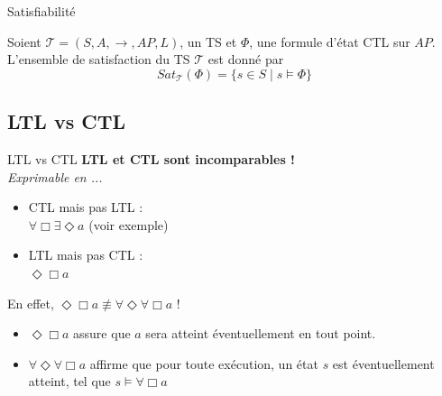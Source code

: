 \documentclass[compress]{beamer}
\begin{document}
\begin{frame}{Satisfiabilité}
  \begin{definition}
    Soient $\mathcal{T} = (S, A, \rightarrow, AP, L)$, un TS et
    $\Phi$, une formule d'état CTL sur $AP$. L'ensemble
    de satisfaction du TS $\mathcal{T}$ est donné par
    \[
      Sat_\mathcal{T}(\Phi) = \{s \in S \; | \; s \models \Phi \}
    \]
  \end{definition}
\end{frame}


\subsection{LTL vs CTL}
\begin{frame}{LTL vs CTL}
\textbf{\alert{\large LTL et CTL sont incomparables !}} \\
\textit{Exprimable en ...}
\begin{itemize}
  \item CTL mais pas LTL :\\
    $\forall\Box\exists\Diamond a$ {\color{gray}(voir exemple)}
  \item LTL mais pas CTL : \\
  $\Diamond\Box a$
\end{itemize}
En effet, \alert{$\Diamond\Box a \not \equiv \forall \Diamond \forall \Box a$ !}
\begin{itemize}
  \item $\Diamond\Box a$ assure que $a$ sera atteint éventuellement en tout point.
  \item $\forall\Diamond\forall\Box a$ affirme que pour toute exécution, un état
    $s$ est éventuellement atteint, tel que $s \models \forall \Box a$
\end{itemize}
\end{frame}
\end{document}
